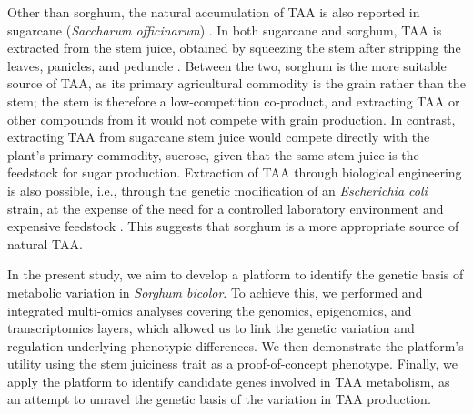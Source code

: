 \hspace{1em}Other than sorghum, the natural accumulation of TAA is also reported in sugarcane (\textit{Saccharum officinarum}) \cite{bruniAconiticAcidRecovery2022a}. In both sugarcane and sorghum, TAA is extracted from the stem juice, obtained by squeezing the stem after stripping the leaves, panicles, and peduncle \cite{chibrikovSweetSorghumJuice2024}. Between the two, sorghum is the more suitable source of TAA, as its primary agricultural commodity is the grain rather than the stem; the stem is therefore a low-competition co-product, and extracting TAA or other compounds from it would not compete with grain production. In contrast, extracting TAA from sugarcane stem juice would compete directly with the plant's primary commodity, sucrose, given that the same stem juice is the feedstock for sugar production. Extraction of TAA through biological engineering is also possible, i.e., through the genetic modification of an \textit{Escherichia coli} strain, at the expense of the need for a controlled laboratory environment and expensive feedstock \cite{guoEfficientTransaconiticAcid2026}. This suggests that sorghum is a more appropriate source of natural TAA.

\hspace{1em}In the present study, we aim to develop a platform to identify the genetic basis of metabolic variation in \textit{Sorghum bicolor}. To achieve this, we performed and integrated multi-omics analyses covering the genomics, epigenomics, and transcriptomics layers, which allowed us to link the genetic variation and regulation underlying phenotypic differences. We then demonstrate the platform's utility using the stem juiciness trait as a proof-of-concept phenotype. Finally, we apply the platform to identify candidate genes involved in TAA metabolism, as an attempt to unravel the genetic basis of the variation in TAA production.



